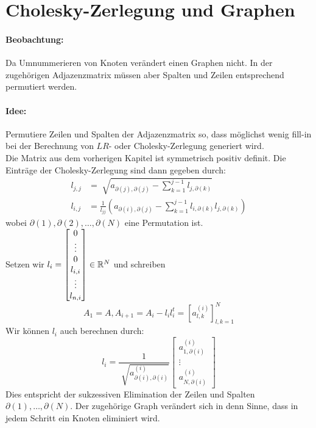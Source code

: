 \section{Cholesky-Zerlegung und Graphen}
\paragraph{Beobachtung:} Da Umnummerieren von Knoten verändert einen Graphen nicht.
In der zugehörigen Adjazenzmatrix müssen aber Spalten und Zeilen entsprechend permutiert werden.
\paragraph{Idee:} Permutiere Zeilen und Spalten der Adjazenzmatrix so, dass möglichst wenig fill-in bei der Berechnung von $LR$- oder Cholesky-Zerlegung generiert wird.\\
Die Matrix aus dem vorherigen Kapitel ist symmetrisch positiv definit. Die Einträge der Cholesky-Zerlegung sind dann gegeben durch:
\begin{align*}
	l_{j,j} &= \sqrt[]{a_{\partial(j),\partial(j)}-\sum_{k=1}^{j-1}l_{j,\partial(k)}}\\ 
	l_{i,j} &= \frac{1}{l_{jj}}\left(a_{\partial(i),\partial(j)} -\sum_{k=1}^{j-1}l_{i,\partial(k)}l_{j,\partial(k)}\right)
\end{align*}
wobei $\partial(1), \partial(2), \ldots , \partial(N)$ eine Permutation ist. \\
Setzen wir $l_i = \begin{bmatrix}
0 \\ \vdots \\ 0 \\ l_{i,i} \\ \vdots \\ l_{n,i}
\end{bmatrix} \in \mathbb{R}^{N}$ und schreiben 
\[
A_1=A, A_{i+1} = A_i -l_il_i^{t} = [a_{l,k}^{(i)}]_{l,k=1}^{N}
\]
Wir können $l_i$ auch berechnen durch:
\begin{equation}
	\label{eqn:li-berechnen}
l_i = \frac{1}{\sqrt[]{a_{\partial(i),\partial(i)}^{(i)}}} \begin{bmatrix}
a_{1, \partial(i)}^{(i)} \\ \vdots \\ a_{N,\partial(i)}^{(i)}
\end{bmatrix}
\end{equation}
Dies entspricht der sukzessiven Elimination der Zeilen und Spalten $\partial(1),\ldots, \partial(N)$. Der zugehörige Graph verändert sich in denn Sinne, dass in jedem Schritt ein Knoten eliminiert wird.
